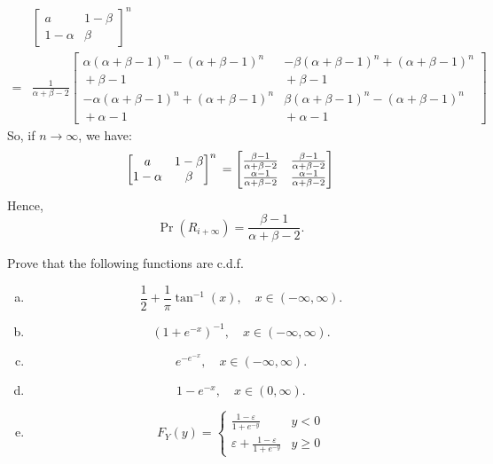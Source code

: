 \documentclass[14pt]{elegantbook}
\begin{document}
\begin{solution}
\begin{enumerate}[(a)]
\begin{align*}
                &\begin{bmatrix}
                    a&1-\beta\\
                    1-\alpha&\beta
                \end{bmatrix}^n\\=&\frac{1}{\alpha + \beta - 2}\begin{bmatrix}
                    \alpha (\alpha + \beta - 1)^n - (\alpha + \beta - 1)^n & -\beta (\alpha + \beta - 1)^n + (\alpha + \beta - 1)^n \\{} + \beta - 1 &{} + \beta - 1\\
                    -\alpha (\alpha + \beta - 1)^n + (\alpha + \beta - 1)^n &{} \beta (\alpha + \beta - 1)^n - (\alpha + \beta - 1)^n \\{} + \alpha - 1 &{} + \alpha - 1
                \end{bmatrix}
            \end{align*}
            So, if $n\to\infty$, we have:
            \[\begin{bmatrix}
                a&1-\beta\\
                1-\alpha&\beta
            \end{bmatrix}^n\\=\begin{bmatrix}
                \frac{\beta-1}{\alpha+\beta-2}&\frac{\beta-1}{\alpha+\beta-2}\\
                \frac{\alpha-1}{\alpha+\beta-2}&\frac{\alpha-1}{\alpha+\beta-2}
            \end{bmatrix}\]
            Hence, \[
                \Pr(R_{i+\infty})=\frac{\beta-1}{\alpha+\beta-2}. 
            \]
        \end{enumerate}
    \end{solution}
    
    \setcounter{exer}{46}
    \setcounter{chapter}{1}

    \begin{exercise}
        Prove that the following functions are c.d.f. 
        \begin{enumerate}[(a)]
            \item \[\frac{1}{2}+\frac{1}{\pi}\tan^{-1}(x), \quad x\in(-\infty,\infty). \]
            \item \[(1+e^{-x})^{-1}, \quad x\in(-\infty,\infty). \]
            \item \[e^{-e^{-x}}, \quad x\in(-\infty, \infty). \]
            \item \[1-e^{-x}, \quad x\in(0, \infty). \]
            \item \[F_Y(y)=\left\{\begin{matrix}
                \frac{1-\varepsilon}{1+e^{-y}}&y<0\\
                \varepsilon+\frac{1-\varepsilon}{1+e^{-y}}&y\geq0
            \end{matrix}\right.\]
        \end{enumerate} 
    \end{exercise}
\end{document}

